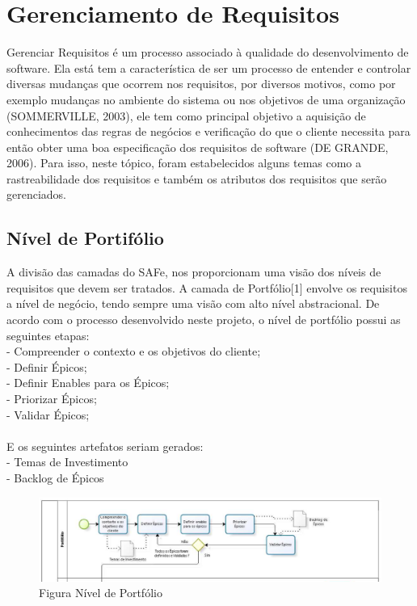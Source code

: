 \chapter[Gerenciamento de Requisitos]{Gerenciamento de Requisitos}

Gerenciar Requisitos é um processo associado à qualidade do desenvolvimento de software. Ela está tem a característica de ser um processo de entender e controlar diversas mudanças que ocorrem nos requisitos, por diversos motivos, como por exemplo mudanças no ambiente do sistema ou nos objetivos de uma organização (SOMMERVILLE, 2003), ele tem como principal objetivo a aquisição de conhecimentos das regras de negócios e verificação do que o cliente necessita para então obter uma boa especificação dos requisitos de software (DE GRANDE, 2006). Para isso, neste tópico, foram estabelecidos alguns temas como a rastreabilidade dos requisitos e também os atributos dos requisitos que serão gerenciados.

\section{Nível de Portifólio}
A divisão das camadas do SAFe, nos proporcionam uma visão dos níveis de requisitos que devem ser tratados. A camada de Portfólio[1] envolve os requisitos a nível de negócio, tendo sempre uma visão com alto nível abstracional. De acordo com o processo desenvolvido neste projeto, o nível de portfólio possui as seguintes etapas:\\
\tab - Compreender o contexto e os objetivos do cliente;\\
\tab - Definir Épicos;\\
\tab - Definir Enables para os Épicos;\\
\tab - Priorizar Épicos;\\
\tab - Validar Épicos;\\
\\
E os seguintes artefatos seriam gerados:\\
\tab - Temas de Investimento\\
\tab - Backlog de Épicos\\

\begin{figure}[h]
    \centering
    \label{fig01}
        \includegraphics[keepaspectratio=true,scale=0.4]{figuras/nivelPortfolioRequisitos.eps}
    \caption{Figura Nível de Portfólio}
\end{figure}

